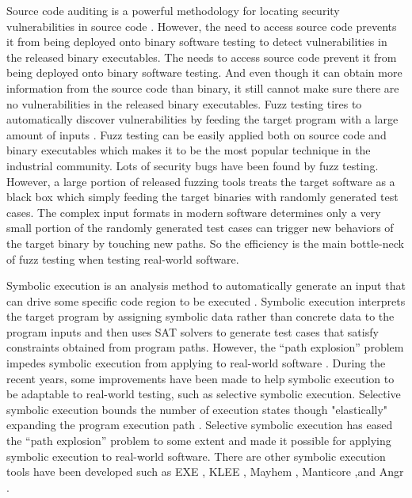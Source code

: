 Source code auditing is a powerful methodology for locating security vulnerabilities in source code \cite{Kuperman:Detection, Lee:audit, schmeelk2012standardizing}. However, the need to access source code prevents it from being deployed onto binary software testing to detect vulnerabilities in the released binary executables. The needs to access source code prevent it from being deployed onto binary software testing. And even though it can obtain more information from the source code than binary, it still cannot make sure there are no vulnerabilities in the released binary executables.
Fuzz testing tires to automatically discover vulnerabilities by feeding the target program with a large amount of inputs \cite{Miller:Fuzz}. Fuzz testing can be easily applied both on source code and binary executables which makes it to be the most popular technique in the industrial community. Lots of security bugs have been found by fuzz testing. However, a large portion of released fuzzing tools treats the target software as a black box which simply feeding the target binaries with randomly generated test cases. The complex input formats in modern software determines only a very small portion of the randomly generated test cases can trigger new behaviors of the target binary by touching new paths. So the efficiency is the main bottle-neck of fuzz testing when testing real-world software.

Symbolic execution is an analysis method to automatically generate an input that can drive some specific code region to be executed \cite{King:Symbex}. Symbolic execution interprets the target program by assigning symbolic data rather than concrete data to the program inputs and then uses SAT solvers to generate test cases that satisfy constraints obtained from program paths. However, the ``path explosion'' problem impedes symbolic execution from applying to real-world software \cite{Boonstoppel:RAP}. During the recent years, some improvements have been made to help symbolic execution to be adaptable to real-world testing, such as selective symbolic execution. Selective symbolic execution bounds the number of execution states though "elastically" expanding the program execution path \cite{chipounov2009selective, chipounov2011s2e}. Selective symbolic execution has eased the ``path explosion'' problem to some extent and made it possible for applying symbolic execution to real-world software. There are other symbolic execution tools have been developed such as EXE \cite{cadar2006exe}, KLEE \cite{cadar2008klee}, Mayhem \cite{cha2012unleashing}, Manticore \cite{online:manticore},and Angr \cite{shoshitaishvili2016sok}. 

